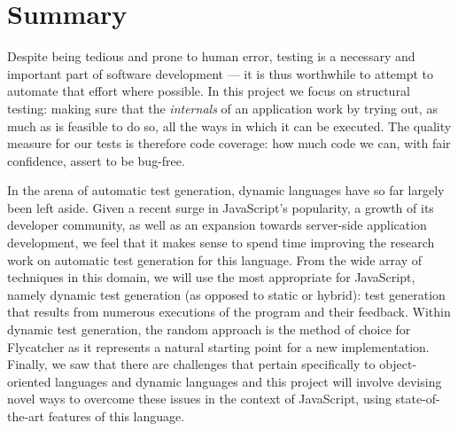 \section{Summary}

Despite being tedious and prone to human error, testing is a necessary and important part of software development --- it is thus worthwhile to attempt to automate that effort where possible. In this project we focus on structural testing: making sure that the \emph{internals} of an application work by trying out, as much as is feasible to do so, all the ways in which it can be executed. The quality measure for our tests is therefore code coverage: how much code we can, with fair confidence, assert to be bug-free.

In the arena of automatic test generation, dynamic languages have so far largely been left aside. Given a recent surge in JavaScript's popularity, a growth of its developer community, as well as an expansion towards server-side application development, we feel that it makes sense to spend time improving the research work on automatic test generation for this language. From the wide array of techniques in this domain, we will use the most appropriate for JavaScript, namely dynamic test generation (as opposed to static or hybrid): test generation that results from numerous executions of the program and their feedback. Within dynamic test generation, the random approach is the method of choice for \textsf{Flycatcher} as it represents a natural starting point for a new implementation. Finally, we saw that there are challenges that pertain specifically to object-oriented languages and dynamic languages and this project will involve devising novel ways to overcome these issues in the context of JavaScript, using state-of-the-art features of this language.